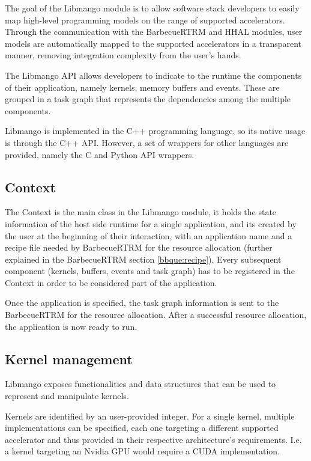 The goal of the Libmango module is to allow software stack developers to easily map high-level programming models on the range of supported accelerators. Through the communication with the BarbecueRTRM and HHAL modules, user models are automatically mapped to the supported accelerators in a transparent manner, removing integration complexity from the user's hands.

The Libmango API allows developers to indicate to the runtime the components of their application, namely kernels, memory buffers and events. These are grouped in a task graph that represents the dependencies among the multiple components. 

Libmango is implemented in the C++ programming language, so its native usage is through the C++ API. However, a set of wrappers for other languages are provided, namely the C and Python API wrappers.

\subsection{Context}
The Context is the main class in the Libmango module, it holds the state information of the host side runtime for a single application, and its created by the user at the beginning of their interaction, with an application name and a recipe file needed by BarbecueRTRM for the resource allocation (further explained in the BarbecueRTRM section \ref{bbque:recipe}). Every subsequent component (kernels, buffers, events and task graph) has to be registered in the Context in order to be considered part of the application.

Once the application is specified, the task graph information is sent to the BarbecueRTRM for the resource allocation. After a successful resource allocation, the application is now ready to run.

\subsection{Kernel management} \label{Libmango:KernelManagement}
Libmango exposes functionalities and data structures that can be used to represent and manipulate kernels.

Kernels are identified by an user-provided integer. For a single kernel, multiple implementations can be specified, each one targeting a different supported accelerator and thus provided in their respective architecture's requirements. I.e. a kernel targeting an Nvidia GPU would require a CUDA implementation.


